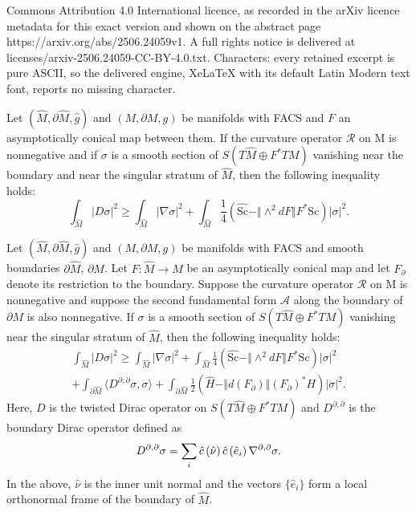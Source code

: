 \documentclass[10pt,a4paper]{amsart}
\newcommand{\Sc}{\mathrm{Sc}}
\newcommand{\bnd}[1]{\partial #1}
\newcommand{\cbar}[1]{\dom{c}\left(#1\right)}
\newcommand{\dom}[1]{\hat{#1}}
\newcommand{\inner}[1]{\langle #1 \rangle}
\newcommand{\onorm}[1]{\Vert #1 \Vert}
\newcommand{\pnorm}[1]{| #1 |}
\begin{document}
Commons Attribution 4.0 International licence, as recorded in the arXiv licence metadata for this exact version and shown on the abstract page https://arxiv.org/abs/2506.24059v1. A full rights notice is delivered at licenses/arxiv-2506.24059-CC-BY-4.0.txt. Characters: every retained excerpt is pure ASCII, so the delivered engine, XeLaTeX with its default Latin Modern text font, reports no missing character.
\begin{theorem}\label{thm:scalar curvature estimate}
    Let \((\dom{M}, \bnd{\dom{M}}, \dom{g})\) and \((M, \bnd{M}, g)\) be manifolds with FACS and \(F\) an asymptotically conical map between them.
    If the curvature operator \(\mathcal{R}\) on M is nonnegative and if \(\sigma\) is a smooth section of \(S(T\dom{M} \oplus F^*TM)\) vanishing near the boundary and near the singular stratum of \(\dom{M}\), then the following inequality holds:
    \begin{equation}\label{eqn:scalar curvature estimate}
        \int_{\dom{M}}\pnorm{D\sigma}^2\geq \int_{\dom{M}}\pnorm{\nabla \sigma}^2+
        \int_{\dom{M}} \frac{1}{4}(\dom{\Sc}-\onorm{\wedge^2dF}F^*\Sc )\pnorm{\sigma}^2.
    \end{equation}
\end{theorem}

\begin{proposition}\label{prop:scalar-mean curvature estimate}
    Let \((\dom{M}, \bnd{\dom{M}}, \dom{g})\) and \((M, \bnd{M}, g)\) be manifolds with FACS and smooth boundaries \(\bnd{\dom{M}}\), \(\bnd{M}\).
    Let \(F\colon \dom{M} \to M\) be an asymptotically conical map and let \(F_\partial\) denote its restriction to the boundary.
    Suppose the curvature operator \(\mathcal{R}\) on M is nonnegative and suppose the second fundamental form \(\mathcal{A}\) along the boundary of \(\bnd{M}\) is also nonnegative.
    If \(\sigma\) is a smooth section of \(S(T\dom{M} \oplus F^*TM)\) vanishing near the singular stratum of \(\dom{M}\), then the following inequality holds:
    \begin{multline}
        \int_{\dom{M}}\pnorm{D\sigma}^2\geq \int_{\dom{M}}\pnorm{\nabla \sigma}^2+\int_{\dom{M}} \frac{1}{4}(\dom{\Sc}-\onorm{\wedge^2dF}F^*\Sc )\pnorm{\sigma}^2\\
        + \int_{\bnd{\dom{M}}} \inner{D^{\partial, \partial} \sigma, \sigma} + \int_{\bnd{\dom{M}}} \frac{1}{2} (\dom{H} - \onorm{d(F_\partial)} (F_\partial)^*H )\pnorm{\sigma}^2.
    \end{multline}
    Here, \(D\) is the twisted Dirac operator on \(S(T\dom{M} \oplus F^*TM)\)  and \(D^{\partial, \partial}\) is the boundary Dirac operator defined as
    \begin{equation*}
        D^{\partial, \partial} \sigma = \sum_i \cbar{\dom{\nu}}\cbar{\dom{e}_i} \conn[\partial, \partial] \sigma.
    \end{equation*}
    In the above, \(\dom{\nu}\) is the inner unit normal and the vectors \(\{\dom{e}_i\}\) form a local orthonormal frame of the boundary of \(\dom{M}\).
\end{proposition}
\end{document}
